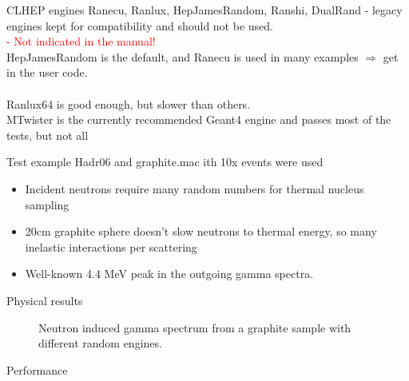 \documentclass[aspectratio=169, 14pt]{beamer}
\begin{document}
\begin{large}
 \begin{frame}{CLHEP engines}
    Ranecu, Ranlux, HepJamesRandom, Ranshi, DualRand - legacy engines kept for compatibility and should not be used.
    \\ \textcolor{red}{ - Not indicated in the manual!}\\
    HepJamesRandom is the default, and Ranecu is used in many examples $\Rightarrow$ get in the user code.\\ \ \\
    Ranlux64 is good enough, but slower than others.\\
    MTwister is the currently recommended Geant4 engine and passes most of the tests, but not all
 \end{frame}
 
 \begin{frame}{Test example}
  Hadr06 and graphite.mac ith 10x events were used
  \begin{itemize}
   \item Incident neutrons require many random numbers for thermal nucleus sampling
   \item 20cm graphite sphere doesn't slow neutrons to thermal energy, so many inelastic interactions per scattering
   \item Well-known 4.4 MeV peak in the outgoing gamma spectra.
  \end{itemize}
 \end{frame}

 \begin{frame}{Physical results}
  \begin{figure}
   \label{GAMMASPECTRUM}
   \scalebox{.6}{}
   \caption*{Neutron induced gamma spectrum from a graphite sample with different random engines.}
  \end{figure}
 \end{frame}

 \begin{frame}{Performance}
  \begin{figure}
   \begin{subfloat}[][]
    \centering
    \scalebox{.33}{}  
   \end{subfloat}
   \begin{subfloat}[][]
    \centering
    \scalebox{.33}{}  
    \label{fig:B}
   \end{subfloat}
  \end{figure}
 \end{frame}


\end{large}
\end{document}
